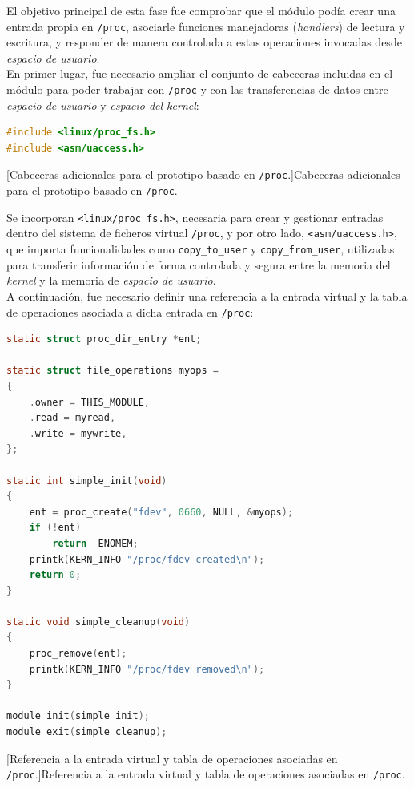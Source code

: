 El objetivo principal de esta fase fue comprobar que el módulo podía crear una entrada propia en \texttt{/proc}, asociarle funciones manejadoras (\textit{handlers}) de lectura y escritura, y responder de manera controlada a estas operaciones invocadas desde \textit{espacio de usuario}.\\

En primer lugar, fue necesario ampliar el conjunto de cabeceras incluidas en el módulo para poder trabajar con \texttt{/proc} y con las transferencias de datos entre \textit{espacio de usuario} y \textit{espacio del kernel}:

\begin{lstlisting}[language=C]
#include <linux/proc_fs.h>
#include <asm/uaccess.h>
\end{lstlisting}
\captionsetup{type=code,justification=centering,singlelinecheck=false}
[Cabeceras adicionales para el prototipo basado en \texttt{/proc}.]{Cabeceras adicionales para el prototipo basado en \texttt{/proc}.}
\label{cod:proc_headers}
\vspace{\baselineskip}

Se incorporan \verb|<linux/proc_fs.h>|, necesaria para crear y gestionar entradas dentro del sistema de ficheros virtual \texttt{/proc}, y por otro lado, \verb|<asm/uaccess.h>|, que importa funcionalidades como \verb|copy_to_user| y \verb|copy_from_user|, utilizadas para transferir información de forma controlada y segura entre la memoria del \textit{kernel} y la memoria de \textit{espacio de usuario}.\\

A continuación, fue necesario definir una referencia a la entrada virtual y la tabla de operaciones asociada a dicha entrada en \texttt{/proc}:\\

\begin{lstlisting}[language=C]
static struct proc_dir_entry *ent;

static struct file_operations myops =
{
    .owner = THIS_MODULE,
    .read = myread,
    .write = mywrite,
};

static int simple_init(void)
{
    ent = proc_create("fdev", 0660, NULL, &myops);
    if (!ent)
        return -ENOMEM;
    printk(KERN_INFO "/proc/fdev created\n");
    return 0;
}

static void simple_cleanup(void)
{
    proc_remove(ent);
    printk(KERN_INFO "/proc/fdev removed\n");
}

module_init(simple_init);
module_exit(simple_cleanup);
\end{lstlisting}
\captionsetup{type=code,justification=centering,singlelinecheck=false}
[Referencia a la entrada virtual y tabla de operaciones asociadas en \texttt{/proc}.]{Referencia a la entrada virtual y tabla de operaciones asociadas en \texttt{/proc}.}
\label{cod:proc_entry_ops}
\vspace{\baselineskip}

